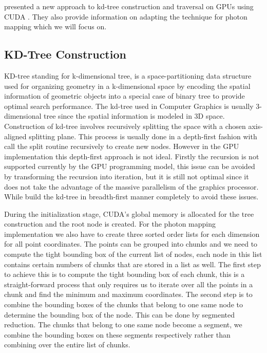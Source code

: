 \citeauthor{Zhou2008} presented a new approach to kd-tree construction and traversal on GPUs using CUDA \cite{Zhou2008}. They also provide information on adapting the technique for photon mapping which we will focus on.

\subsection{KD-Tree Construction}
\label{subsec:kdtree_construction}

KD-tree standing for k-dimensional tree, is a space-partitioning data structure used for organizing geometry in a k-dimensional space by encoding the spatial information of geometric objects into a special case of binary tree to provide optimal search performance. The kd-tree used in Computer Graphics is usually 3-dimensional tree since the spatial information is modeled in 3D space. Construction of kd-tree involves recursively splitting the space with a chosen axis-aligned splitting plane. This process is usually done in a depth-first fashion with call the split routine recursively to create new nodes. However in the GPU implementation this depth-first approach is not ideal. Firstly the recursion is not supported currently by the GPU programming model, this issue can be avoided by transforming the recursion into iteration, but it is still not optimal since it does not take the advantage of the massive parallelism of the graphics processor. While \citeauthor{Zhou2008} build the kd-tree in breadth-first manner completely to avoid these issues. 


During the initialization stage, CUDA's global memory is allocated for the tree construction and the root node is created. For the photon mapping implementation we also have to create three sorted order lists for each dimension for all point coordinates. The points can be grouped into chunks and we need to compute the tight bounding box of the current list of nodes, each node in this list contains certain numbers of chunks that are stored in a list as well. The first step to achieve this is to compute the tight bounding box of each chunk, this is a straight-forward process that only requires us to iterate over all the points in a chunk and find the minimum and maximum coordinates. The second step is to combine the bounding boxes of the chunks that belong to one same node to determine the bounding box of the node. This can be done by segmented reduction. The chunks that belong to one same node become a segment, we combine the bounding boxes on these segments respectively rather than combining over the entire list of chunks. 

